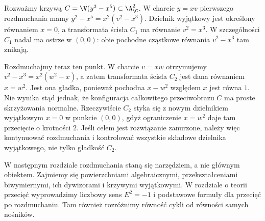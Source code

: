 \begin{przyklad}[Dwa kolejne rozdmuchania ostrza $y^2=x^5$]
Rozważmy krzywą $C=\V(y^2-x^5)\subset\A^2_{\C}$.
W charcie $y=xv$ pierwszego rozdmuchania mamy
$y^2-x^5=x^2(v^2-x^3)$. Dzielnik wyjątkowy jest
określony równaniem $x=0$, a transformata ścisła
$C_1$ ma równanie $v^2=x^3$. W szczególności
$C_1$ nadal ma ostrze w $(0,0)$: obie pochodne
cząstkowe równania $v^2-x^3$ tam znikają.

Rozdmuchajmy teraz ten punkt. W charcie $v=xw$
otrzymujemy $v^2-x^3=x^2(w^2-x)$, a zatem
transformata ścisła $C_2$ jest dana równaniem
$x=w^2$. Jest ona gładka, ponieważ pochodna
$x-w^2$ względem $x$ jest równa $1$.
Nie wynika stąd jednak, że konfiguracja całkowitego
przeciwobrazu $C$ ma proste skrzyżowania normalne.
Rzeczywiście $C_2$ styka się z nowym dzielnikiem
wyjątkowym $x=0$ w punkcie $(0,0)$, gdyż ograniczenie
$x=w^2$ daje tam przecięcie o krotności $2$.
Jeśli celem jest rozwiązanie zanurzone, należy więc
kontynuować rozdmuchania i kontrolować wszystkie
składowe dzielnika wyjątkowego, nie tylko gładkość $C_2$.
\end{przyklad}

\begin{uwaga}
W następnym rozdziale rozdmuchania staną się
narzędziem, a nie głównym obiektem. Zajmiemy się
powierzchniami algebraicznymi, przekształceniami
biwymiernymi, ich dywizorami i krzywymi wyjątkowymi.
W rozdziale o teorii przecięć wyprowadzimy
liczbowy sens $E^2=-1$ i podstawowe formuły
dla przecięć po rozdmuchaniu. Tam również rozróżnimy
równość cykli od równości samych nośników.
\end{uwaga}



